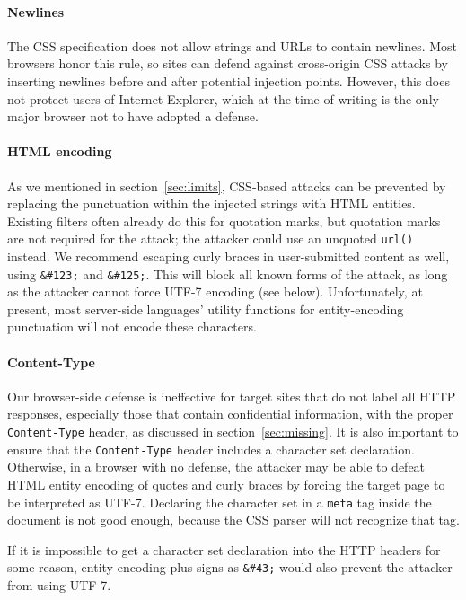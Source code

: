 \documentclass{acm_proc_article-sp}
\begin{document}
\paragraph{Newlines}
The CSS specification does not allow strings and URLs to contain
newlines.  Most browsers honor this rule, so sites can defend against
cross-origin CSS attacks by inserting newlines before and after
potential injection points.  However, this does not protect users of
Internet Explorer, which at the time of writing is the only major
browser not to have adopted a defense.

\paragraph{HTML encoding}
As we mentioned in section~\ref{sec:limits}, CSS-based attacks can be
prevented by replacing the punctuation within the injected strings
with HTML entities.  Existing filters often already do this for
quotation marks, but quotation marks are not required for the attack;
the attacker could use an unquoted \texttt{url()} instead.  We
recommend escaping curly braces in user-submitted content as well,
using \verb|&#123;| and \verb|&#125;|.  This will block all known
forms of the attack, as long as the attacker cannot force UTF-7
encoding (see below).  Unfortunately, at present, most server-side
languages' utility functions for entity-encoding punctuation will not
encode these characters.

\paragraph{Content-Type}
Our browser-side defense is ineffective for target sites that do not
label all HTTP responses, especially those that contain confidential
information, with the proper \texttt{Content-Type} header, as
discussed in section~\ref{sec:missing}.  It is also important to
ensure that the \texttt{Content-Type} header includes a character set
declaration.  Otherwise, in a browser with no defense, the attacker
may be able to defeat HTML entity encoding of quotes and curly braces
by forcing the target page to be interpreted as UTF-7.  Declaring the
character set in a \texttt{meta} tag inside the document is not good
enough, because the CSS parser will not recognize that tag.

If it is impossible to get a character set declaration into the HTTP
headers for some reason, entity-encoding plus signs as \verb|&#43;|
would also prevent the attacker from using UTF-7.
\end{document}
